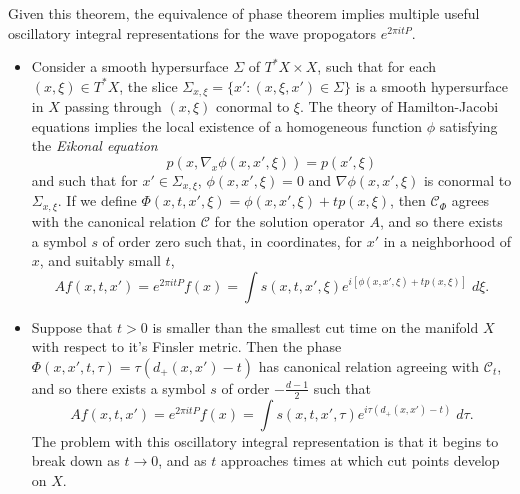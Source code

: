 Given this theorem, the equivalence of phase theorem implies multiple useful oscillatory integral representations for the wave propogators $e^{2 \pi i t P}$.
\begin{itemize}
  \item Consider a smooth hypersurface $\Sigma$ of $T^* X \times X$, such that for each $(x,\xi) \in T^* X$, the slice $\Sigma_{x,\xi} = \{ x' : (x,\xi,x') \in \Sigma \}$ is a smooth hypersurface in $X$ passing through $(x,\xi)$ conormal to $\xi$. The theory of Hamilton-Jacobi equations implies the local existence of a homogeneous function $\phi$ satisfying the \emph{Eikonal equation}
  \begin{equation} \label{awiodjawoidhjioq23412341234234}
    p(x, \nabla_x \phi(x,x',\xi)) = p(x',\xi)
  \end{equation}
  and such that for $x' \in \Sigma_{x,\xi}$, $\phi(x,x',\xi) = 0$ and $\nabla \phi(x,x',\xi)$ is conormal to $\Sigma_{x,\xi}$. If we define $\Phi(x,t,x',\xi) = \phi(x,x',\xi) + t p(x,\xi)$, then $\mathcal{C}_\Phi$ agrees with the canonical relation $\mathcal{C}$ for the solution operator $A$, and so there exists a symbol $s$ of order zero such that, in coordinates, for $x'$ in a neighborhood of $x$, and suitably small $t$,
  \begin{equation} Af(x,t,x') = e^{2 \pi i t P}f(x) = \int s(x,t,x',\xi) e^{i [ \phi(x,x',\xi) + t p(x,\xi) ]}\; d \xi. \end{equation}

  \item Suppose that $t > 0$ is smaller than the smallest cut time on the manifold $X$ with respect to it's Finsler metric. Then the phase $\Phi(x,x',t,\tau) = \tau( d_+(x,x') - t)$ has canonical relation agreeing with $\mathcal{C}_t$, and so there exists a symbol $s$ of order $- \tfrac{d-1}{2}$ such that
  \begin{equation}
    Af(x,t,x') = e^{2 \pi i t P} f(x) = \int s(x,t,x',\tau) e^{i \tau( d_+(x,x') - t )}\; d\tau.
  \end{equation}
  The problem with this oscillatory integral representation is that it begins to break down as $t \to 0$, and as $t$ approaches times at which cut points develop on $X$.


\end{itemize}
